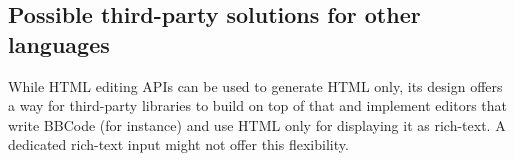 \subsection{Possible third-party solutions for other languages}
\label{subsec:edit_api_adv_thir_party_lang}

While HTML editing APIs can be used to generate HTML only, its design offers a way for third-party libraries to build on top of that and implement editors that write BBCode (for instance) and use HTML only for displaying it as rich-text. A dedicated rich-text input might not offer this flexibility.